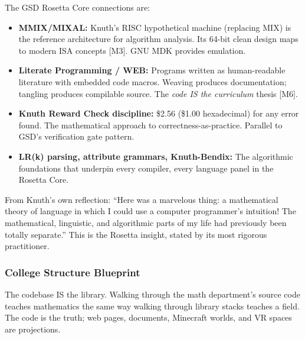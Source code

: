 \documentclass[11pt,letterpaper]{article}
\begin{document}
The GSD Rosetta Core connections are:
\begin{itemize}[leftmargin=1.5em]
  \item \textbf{MMIX/MIXAL:} Knuth's RISC hypothetical machine (replacing MIX) is the reference architecture for algorithm analysis. Its 64-bit clean design maps to modern ISA concepts [M3]. GNU MDK provides emulation.
  \item \textbf{Literate Programming / WEB:} Programs written as human-readable literature with embedded code macros. Weaving produces documentation; tangling produces compilable source. The \textit{code IS the curriculum} thesis [M6].
  \item \textbf{Knuth Reward Check discipline:} \$2.56 (\$1.00 hexadecimal) for any error found. The mathematical approach to correctness-as-practice. Parallel to GSD's verification gate pattern.
  \item \textbf{LR(k) parsing, attribute grammars, Knuth-Bendix:} The algorithmic foundations that underpin every compiler, every language panel in the Rosetta Core.
\end{itemize}

From Knuth's own reflection: ``Here was a marvelous thing: a mathematical theory of language in which I could use a computer programmer's intuition! The mathematical, linguistic, and algorithmic parts of my life had previously been totally separate.'' This is the Rosetta insight, stated by its most rigorous practitioner.

\subsubsection{College Structure Blueprint}

The codebase IS the library. Walking through the math department's source code teaches mathematics the same way walking through library stacks teaches a field. The code is the truth; web pages, documents, Minecraft worlds, and VR spaces are projections.
\end{document}
